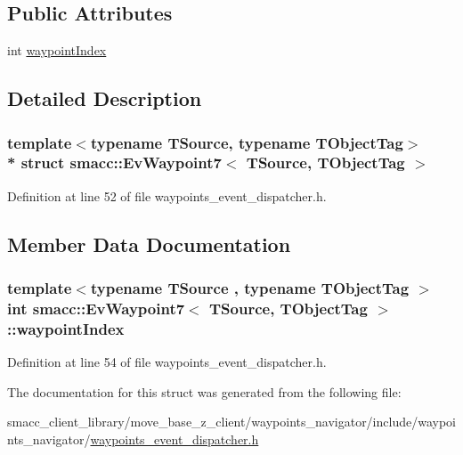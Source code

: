 \subsection*{Public Attributes}
\begin{DoxyCompactItemize}
\item 
int \hyperlink{structsmacc_1_1EvWaypoint7_af6b562dddfe6287748523ec57dd94df0}{waypoint\+Index}
\end{DoxyCompactItemize}


\subsection{Detailed Description}
\subsubsection*{template$<$typename T\+Source, typename T\+Object\+Tag$>$\\*
struct smacc\+::\+Ev\+Waypoint7$<$ T\+Source, T\+Object\+Tag $>$}



Definition at line 52 of file waypoints\+\_\+event\+\_\+dispatcher.\+h.



\subsection{Member Data Documentation}
\subsubsection[{\texorpdfstring{waypoint\+Index}{waypointIndex}}]{\setlength{\rightskip}{0pt plus 5cm}template$<$typename T\+Source , typename T\+Object\+Tag $>$ int {\bf smacc\+::\+Ev\+Waypoint7}$<$ T\+Source, T\+Object\+Tag $>$\+::waypoint\+Index}\hypertarget{structsmacc_1_1EvWaypoint7_af6b562dddfe6287748523ec57dd94df0}{}\label{structsmacc_1_1EvWaypoint7_af6b562dddfe6287748523ec57dd94df0}


Definition at line 54 of file waypoints\+\_\+event\+\_\+dispatcher.\+h.



The documentation for this struct was generated from the following file\+:\begin{DoxyCompactItemize}
\item 
smacc\+\_\+client\+\_\+library/move\+\_\+base\+\_\+z\+\_\+client/waypoints\+\_\+navigator/include/waypoints\+\_\+navigator/\hyperlink{waypoints__event__dispatcher_8h}{waypoints\+\_\+event\+\_\+dispatcher.\+h}\end{DoxyCompactItemize}
